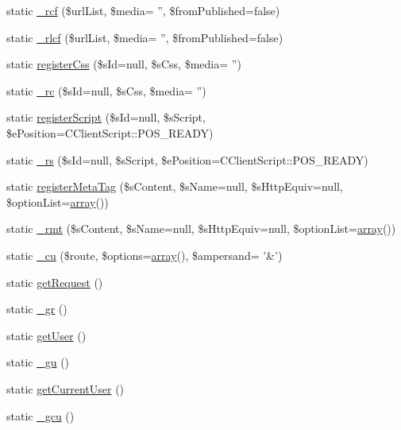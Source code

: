 \begin{DoxyCompactItemize}
static \hyperlink{classCPSHelperBase_a617fe0ffa46c9fc20d8c3576a2c73cf8}{\_\-rcf} (\$urlList, \$media= '', \$fromPublished=false)
\item 
static \hyperlink{classCPSHelperBase_ab608e015cc2117b42d41efd1c1d0c579}{\_\-rlcf} (\$urlList, \$media= '', \$fromPublished=false)
\item 
static \hyperlink{classCPSHelperBase_a3a928e106e05c16f08e82ef4164bfaa6}{registerCss} (\$sId=null, \$sCss, \$media= '')
\item 
static \hyperlink{classCPSHelperBase_a631b30f9b1ef5e922e29ed4156e9bb53}{\_\-rc} (\$sId=null, \$sCss, \$media= '')
\item 
static \hyperlink{classCPSHelperBase_a9fcce4225d8f12cbd7edcf81b27b8f42}{registerScript} (\$sId=null, \$sScript, \$ePosition=CClientScript::POS\_\-READY)
\item 
static \hyperlink{classCPSHelperBase_a982d30aee3a52f73b0e935ef7c81b03b}{\_\-rs} (\$sId=null, \$sScript, \$ePosition=CClientScript::POS\_\-READY)
\item 
static \hyperlink{classCPSHelperBase_a67dc608077892b02987ad777c692a8f5}{registerMetaTag} (\$sContent, \$sName=null, \$sHttpEquiv=null, \$optionList=\hyperlink{list_8php_aa3205d038c7f8feb5c9f01ac4dfadc88}{array}())
\item 
static \hyperlink{classCPSHelperBase_af3914b438afd8512cd3e83700be57960}{\_\-rmt} (\$sContent, \$sName=null, \$sHttpEquiv=null, \$optionList=\hyperlink{list_8php_aa3205d038c7f8feb5c9f01ac4dfadc88}{array}())
\item 
static \hyperlink{classCPSHelperBase_a52be8b5ea3282bce6405f2e579e6db30}{\_\-cu} (\$route, \$options=\hyperlink{list_8php_aa3205d038c7f8feb5c9f01ac4dfadc88}{array}(), \$ampersand= '\&')
\item 
static \hyperlink{classCPSHelperBase_a8bc323d82e5265f16d9cd356d0a02dba}{getRequest} ()
\item 
static \hyperlink{classCPSHelperBase_ad94454df47e24b75197910a090e61ffa}{\_\-gr} ()
\item 
static \hyperlink{classCPSHelperBase_aeeb9b927f96ebe9c88760d70afa39abe}{getUser} ()
\item 
static \hyperlink{classCPSHelperBase_ae7d5a13ae379e82d5d28bbc2a480f524}{\_\-gu} ()
\item 
static \hyperlink{classCPSHelperBase_abe39ee9bd8c9467fd15bdd3da6528f3d}{getCurrentUser} ()
\item 
static \hyperlink{classCPSHelperBase_a23d250b00a90dbb026ebe72ce040eca4}{\_\-gcu} ()
\item 

\end{DoxyCompactItemize}
